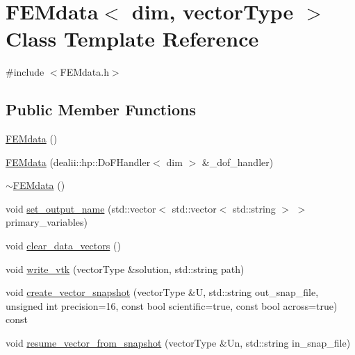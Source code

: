 \section{F\-E\-Mdata$<$ dim, vector\-Type $>$ Class Template Reference}
\label{class_f_e_mdata}


{\ttfamily \#include $<$F\-E\-Mdata.\-h$>$}

\subsection*{Public Member Functions}
\begin{DoxyCompactItemize}
\item 
\hyperlink{class_f_e_mdata_abb8edbdb28fbec855696a4a02648ad2d}{F\-E\-Mdata} ()
\item 
\hyperlink{class_f_e_mdata_ada690a46b4cec06866ffa32ca2e07c07}{F\-E\-Mdata} (dealii\-::hp\-::\-Do\-F\-Handler$<$ dim $>$ \&\-\_\-dof\-\_\-handler)
\item 
\hyperlink{class_f_e_mdata_ab7baf283d0dd33996919e2530b735d84}{$\sim$\-F\-E\-Mdata} ()
\item 
void \hyperlink{class_f_e_mdata_a770f8539c16d21624bcedc1f6bee9d68}{set\-\_\-output\-\_\-name} (std\-::vector$<$ std\-::vector$<$ std\-::string $>$ $>$ primary\-\_\-variables)
\item 
void \hyperlink{class_f_e_mdata_ac201e22d75178ffe4d4355c53ee0b756}{clear\-\_\-data\-\_\-vectors} ()
\item 
void \hyperlink{class_f_e_mdata_a62d54e01135c4ab0b58f51441732dca3}{write\-\_\-vtk} (vector\-Type \&solution, std\-::string path)
\item 
void \hyperlink{class_f_e_mdata_a1c60b025bc1f1de692cabdd1f253d343}{create\-\_\-vector\-\_\-snapshot} (vector\-Type \&U, std\-::string out\-\_\-snap\-\_\-file, unsigned int precision=16, const bool scientific=true, const bool across=true) const 
\item 
void \hyperlink{class_f_e_mdata_a2611613e158345b619062316e281c4c9}{resume\-\_\-vector\-\_\-from\-\_\-snapshot} (vector\-Type \&Un, std\-::string in\-\_\-snap\-\_\-file)
\end{DoxyCompactItemize}
